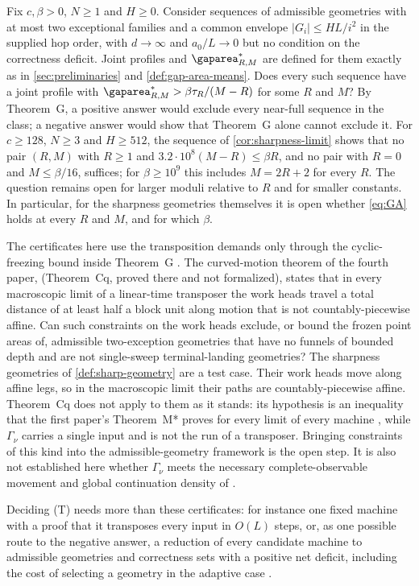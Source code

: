 \begin{problem}\label{prob:two-exception}
Fix $c,\beta>0$, $N\ge1$ and $H\ge0$. Consider sequences of admissible geometries with at most
two exceptional families and a common envelope $|G_i|\le HL/i^2$ in the supplied hop
order, with $d\to\infty$ and $a_0/L\to0$ but no condition on the correctness deficit.
Joint profiles and $\limarea_{R,M}$ are defined for them exactly as in
\cref{sec:preliminaries} and \cref{def:gap-area-means}. Does every such sequence have
a joint profile with $\limarea_{R,M}>\beta\tau_R/(M-R)$ for some $R$ and $M$? By
Theorem~G, a positive answer would exclude every near-full sequence in the class; a
negative answer would show that Theorem~G alone cannot exclude it. For $c\ge128$,
$N\ge3$ and $H\ge512$, the sequence of \cref{cor:sharpness-limit} shows that no pair
$(R,M)$ with $R\ge1$ and $3.2\cdot10^8(M-R)\le\beta R$, and no pair with $R=0$ and
$M\le\beta/16$, suffices; for $\beta\ge10^9$ this includes $M=2R+2$ for every $R$. The
question remains open for larger moduli relative to $R$ and for smaller constants. In
particular, for the sharpness geometries themselves it is open whether \eqref{eq:GA}
holds at every $R$ and $M$, and for which $\beta$.
\end{problem}

\begin{problem}\label{prob:transposition-input}
The certificates here use the transposition demands only through the cyclic-freezing
bound inside Theorem~G \cite[Theorem~2.9]{SourceCovers2026}. The curved-motion theorem
of the fourth paper, \cite[Theorem~3.12]{FourthPaper2026} (Theorem~Cq, proved there and
not formalized), states that in every macroscopic limit of a linear-time transposer the
work heads travel a total distance of at least half a block unit along motion that is
not countably-piecewise affine. Can such constraints on the work heads exclude, or
bound the frozen point areas of, admissible two-exception geometries that have no
funnels of bounded depth and are not single-sweep terminal-landing geometries? The
sharpness geometries of \cref{def:sharp-geometry} are a test case. Their work heads move
along affine legs, so in the macroscopic limit their paths are countably-piecewise affine.
Theorem~Cq does not apply to them as it stands: its hypothesis is an inequality that the
first paper's Theorem~M* proves for every limit of every machine
\cite[Section~3]{FourthPaper2026}, while $\Gamma_\nu$ carries a single input and is not
the run of a transposer. Bringing constraints of this kind into the admissible-geometry
framework is the open step. It is also not established here whether $\Gamma_\nu$ meets
the necessary complete-observable movement and global continuation density of
\cite[Corollaries~4.8 and~5.3]{SourceCovers2026}.
\end{problem}

Deciding (T) needs more than these certificates: for instance one fixed machine with a
proof that it transposes every input in $O(L)$ steps, or, as one possible route to the
negative answer, a reduction of every candidate machine to admissible geometries and
correctness sets with a positive net deficit, including the cost of selecting a geometry
in the adaptive case \cite[Section~9.3]{SourceCovers2026}.
